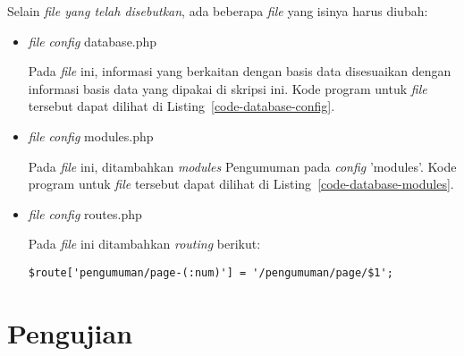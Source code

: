 Selain \textit{file yang telah disebutkan}, ada beberapa \textit{file} yang isinya harus diubah:
\begin{itemize}
\item \textit{file} \textit{config} database.php

Pada \textit{file} ini, informasi yang berkaitan dengan basis data disesuaikan dengan informasi basis data yang dipakai di skripsi ini. Kode program untuk \textit{file} tersebut dapat dilihat di Listing~\ref{code-database-config}.



\item \textit{file} \textit{config} modules.php

Pada \textit{file} ini, ditambahkan \textit{modules} Pengumuman pada \textit{config} 'modules'. Kode program untuk \textit{file} tersebut dapat dilihat di Listing~\ref{code-database-modules}.



\item \textit{file} \textit{config} routes.php

Pada \textit{file} ini ditambahkan \textit{routing} berikut:
\begin{lstlisting}
$route['pengumuman/page-(:num)'] = '/pengumuman/page/$1';
\end{lstlisting}
\end{itemize}

\section{Pengujian}
